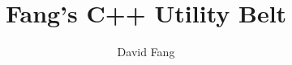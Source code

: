 \documentclass[12pt]{book}
\newif\ifpdf
\begin{document}
\title{Fang's C++ Utility Belt}
\author{David Fang}

\ifpdf\pdfbookmark[0]{Title Page}{title}\fi
\maketitle

\ifpdf\pdfbookmark[0]{Table of Contents}{toc}\fi
\tableofcontents






\ifpdf\pdfbookmark[0]{Bibliography}{bibliography}\fi
{}


\clearpage
\ifpdf\pdfbookmark[0]{Index}{index}\fi
\printindex
\end{document}
